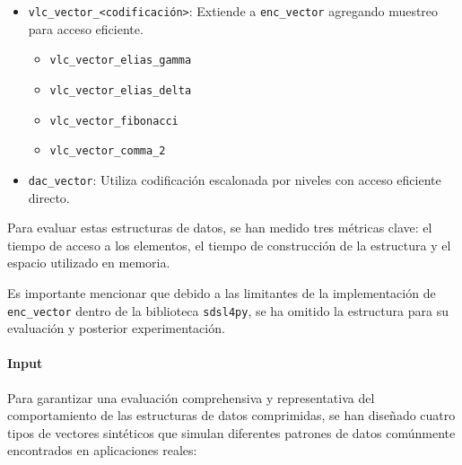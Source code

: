 \begin{enumerate}
\begin{enumerate}
\begin{itemize}
                \item \texttt{vlc\_vector\_<codificación>}:
                Extiende a \texttt{enc\_vector} agregando muestreo para acceso eficiente.
                \begin{itemize}
                    \item \texttt{vlc\_vector\_elias\_gamma}
                    \item \texttt{vlc\_vector\_elias\_delta}
                    \item \texttt{vlc\_vector\_fibonacci}
                    \item \texttt{vlc\_vector\_comma\_2}
                \end{itemize}

                \item \texttt{dac\_vector}:
                Utiliza codificación escalonada por niveles con acceso eficiente directo.
            \end{itemize}
        \end{enumerate}
\end{enumerate}


Para evaluar estas estructuras de datos, se han medido tres métricas clave: el tiempo de acceso a los elementos, el tiempo de construcción de la estructura y el espacio utilizado en memoria. 

Es importante mencionar que debido a las limitantes de la implementación de \texttt{enc\_vector} dentro de la biblioteca \texttt{sdsl4py}, se ha omitido la estructura para su evaluación y posterior experimentación. 

\paragraph{Input}
\vspace{0.2cm}

Para garantizar una evaluación comprehensiva y representativa del comportamiento de las estructuras de datos comprimidas, se han diseñado cuatro tipos de vectores sintéticos que simulan diferentes patrones de datos comúnmente encontrados en aplicaciones reales:

